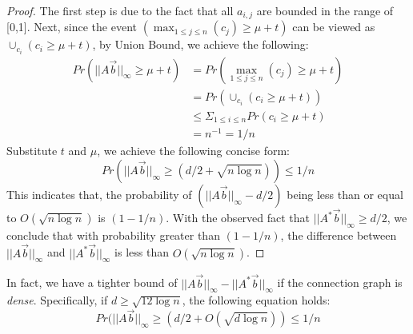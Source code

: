 \begin{proof}
The first step is due to the fact that all $a_{i,j}$ are bounded in the range of [0,1]. 
Next, since the event $(\max_{1\leq j \leq n}(c_j) \geq \mu + t)$ can be viewed as
$\cup_{c_i} (c_i \geq \mu + t )$, by Union Bound, we achieve the following:
\begin{equation*}
\begin{split}
	Pr(||A\vec{b}||_\infty \geq \mu + t) &=Pr(\max_{1\leq j \leq n}(c_j) \geq \mu + t)  \\
		& = Pr(\cup_{c_i} (c_i \geq \mu + t )) \\
		&\leq \Sigma_{1 \leq i \leq n} Pr(c_i \geq \mu + t) \\
		& = n^{-1} = 1/n
\end{split}
\end{equation*}
Substitute $t$ and $\mu$, we achieve the following concise form:
\begin{equation*}
	Pr(||A\vec{b}||_\infty \geq (d/2 + \sqrt{n\log n})) \leq 1/n
\end{equation*}
This indicates that, the probability of $(||A\vec{b}||_\infty-d/2)$ being less than or equal to $ O(\sqrt{n\log n})$ is $(1-1/n)$. With the observed fact that $||A^*\vec{b}||_\infty \geq d/2$, we conclude that
with probability greater than $(1-1/n)$, 
the difference between $||A\vec{b}||_\infty$ and $||A^*\vec{b}||_\infty$ is less than $O(\sqrt{n\log n})$.
\end{proof}

In fact, we have a tighter bound of $||A\vec{b}||_\infty -||A^*\vec{b}||_\infty$ if 
the connection graph is \emph{dense}. Specifically, if $d\geq \sqrt{12\log n}$, the following
equation holds:
\begin{equation*}
Pr(||A\vec{b}||_\infty \geq (d/2 + O(\sqrt{d\log n})) \leq 1/n
\end{equation*}

